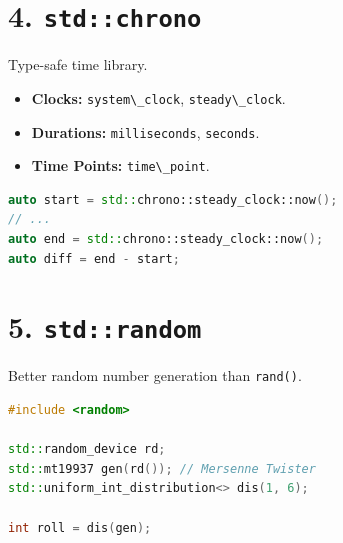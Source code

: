 \hypertarget{stdchrono}{%
\section{\texorpdfstring{4.
\texttt{std::chrono}}{4. std::chrono}}\label{stdchrono}}

Type-safe time library.

\begin{itemize}
\tightlist
\item
  \textbf{Clocks:} \passthrough{\lstinline!system\_clock!},
  \passthrough{\lstinline!steady\_clock!}.
\item
  \textbf{Durations:} \passthrough{\lstinline!milliseconds!},
  \passthrough{\lstinline!seconds!}.
\item
  \textbf{Time Points:} \passthrough{\lstinline!time\_point!}.
\end{itemize}

\begin{lstlisting}[language={C++}]
auto start = std::chrono::steady_clock::now();
// ...
auto end = std::chrono::steady_clock::now();
auto diff = end - start;
\end{lstlisting}

\hypertarget{stdrandom}{%
\section{\texorpdfstring{5.
\texttt{std::random}}{5. std::random}}\label{stdrandom}}

Better random number generation than \passthrough{\lstinline!rand()!}.

\begin{lstlisting}[language={C++}]
#include <random>

std::random_device rd;
std::mt19937 gen(rd()); // Mersenne Twister
std::uniform_int_distribution<> dis(1, 6);

int roll = dis(gen);
\end{lstlisting}
